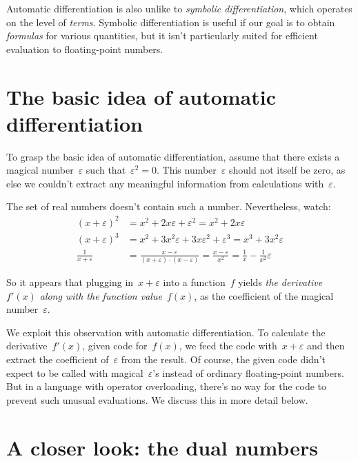\documentclass[a4paper,ngerman,12pt]{scrartcl}
\theoremstyle{definition}
\theoremstyle{plain}
\theoremstyle{remark}
\begin{document}
Automatic differentiation is also unlike to \emph{symbolic differentiation},
which operates on the level of \emph{terms}. Symbolic differentiation is useful
if our goal is to obtain \emph{formulas} for various quantities, but it isn't
particularly suited for efficient evaluation to floating-point numbers.


\section{The basic idea of automatic differentiation}

To grasp the basic idea of automatic differentiation, assume that there exists
a magical number~$\varepsilon$ such that~$\varepsilon^2 = 0$. This
number~$\varepsilon$ should not itself be zero, as else we couldn't extract any
meaningful information from calculations with~$\varepsilon$.

The set of real numbers doesn't contain such a number. Nevertheless, watch:
\begin{align*}
  (x+\varepsilon)^2 &= x^2 + 2x\varepsilon + \varepsilon^2 = x^2 + 2x\varepsilon \\
  (x+\varepsilon)^3 &= x^2 + 3x^2\varepsilon + 3x\varepsilon^2 + \varepsilon^3 = x^3 + 3x^2\varepsilon \\
  \frac{1}{x+\varepsilon} &= \frac{x-\varepsilon}{(x+\varepsilon) \cdot
  (x-\varepsilon)} = \frac{x-\varepsilon}{x^2} = \frac{1}{x} - \frac{1}{x^2}
  \varepsilon
\end{align*}

So it appears that plugging in~$x + \varepsilon$ into a function~$f$ yields
\emph{the derivative~$f'(x)$ along with the function value~$f(x)$}, as the
coefficient of the magical number~$\varepsilon$.

We exploit this observation with automatic differentiation. To calculate the
derivative~$f'(x)$, given code for~$f(x)$, we feed the code with~$x +
\varepsilon$ and then extract the coefficient of~$\varepsilon$ from the result.
Of course, the given code didn't expect to be called with
magical~$\varepsilon$'s instead of ordinary floating-point numbers. But in a
language with operator overloading, there's no way for the code to prevent such
unusual evaluations. We discuss this in more detail below.


\section{A closer look: the dual numbers}
\end{document}
